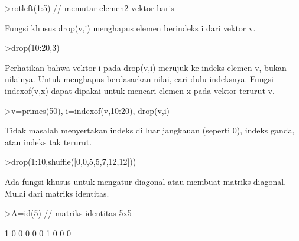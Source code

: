 \documentclass[a4paper,10pt]{article}
\begin{document}
\begin{eulernotebook}
\begin{eulercomment}
\begin{eulercomment}
\begin{eulercomment}
\begin{eulercomment}
\begin{eulercomment}
\begin{eulercomment}
\begin{eulercomment}
\begin{eulercomment}
\begin{eulercomment}
\begin{eulercomment}
\begin{eulercomment}
\begin{eulercomment}
\begin{eulercomment}
\begin{eulercomment}
\begin{eulerprompt}
>rotleft(1:5) // memutar elemen2 vektor baris
\end{eulerprompt}
\begin{euleroutput}
  [2,  3,  4,  5,  1]
\end{euleroutput}
\begin{eulercomment}
Fungsi khusus drop(v,i) menghapus elemen berindeks i dari vektor v.
\end{eulercomment}
\begin{eulerprompt}
>drop(10:20,3)
\end{eulerprompt}
\begin{euleroutput}
  [10,  11,  13,  14,  15,  16,  17,  18,  19,  20]
\end{euleroutput}
\begin{eulercomment}
Perhatikan bahwa vektor i pada drop(v,i) merujuk ke indeks elemen v, bukan
nilainya. Untuk menghapus berdasarkan nilai, cari dulu indeksnya. Fungsi
indexof(v,x) dapat dipakai untuk mencari elemen x pada vektor terurut v.
\end{eulercomment}
\begin{eulerprompt}
>v=primes(50), i=indexof(v,10:20), drop(v,i)
\end{eulerprompt}
\begin{euleroutput}
  [2,  3,  5,  7,  11,  13,  17,  19,  23,  29,  31,  37,  41,  43,  47]
  [0,  5,  0,  6,  0,  0,  0,  7,  0,  8,  0]
  [2,  3,  5,  7,  23,  29,  31,  37,  41,  43,  47]
\end{euleroutput}
\begin{eulercomment}
Tidak masalah menyertakan indeks di luar jangkauan (seperti 0), indeks
ganda, atau indeks tak terurut.
\end{eulercomment}
\begin{eulerprompt}
>drop(1:10,shuffle([0,0,5,5,7,12,12]))
\end{eulerprompt}
\begin{euleroutput}
  [1,  2,  3,  4,  6,  8,  9,  10]
\end{euleroutput}
\begin{eulercomment}
Ada fungsi khusus untuk mengatur diagonal atau membuat matriks diagonal.
Mulai dari matriks identitas.
\end{eulercomment}
\begin{eulerprompt}
>A=id(5) // matriks identitas 5x5
\end{eulerprompt}
\begin{euleroutput}
              1             0             0             0             0 
              0             1             0             0             0 

\end{euleroutput}
\end{eulercomment}
\end{eulercomment}
\end{eulercomment}
\end{eulercomment}
\end{eulercomment}
\end{eulercomment}
\end{eulercomment}
\end{eulercomment}
\end{eulercomment}
\end{eulercomment}
\end{eulercomment}
\end{eulercomment}
\end{eulercomment}
\end{eulercomment}
\end{eulernotebook}
\end{document}

